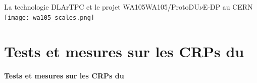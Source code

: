     \begin{frame}{La technologie DLArTPC et le projet WA105}{WA105/\texorpdfstring{ProtoDU$\nu$E}{ProtoDUNE}-DP au CERN}
        \centering
    	\vspace{-0.5cm}\hspace{-0.4cm}\texttt{[image: wa105\_scales.png]}
    \end{frame}

    \section[Tests des CRPs]{Tests et mesures sur les CRPs du \SSS{}}

    {
        \begin{specialframe}
            \vspace{2cm}\hspace*{-1.8cm}\parbox[t]{\textwidth}{
                \begin{center}
                    \begin{Huge}
                            \textcolor{pheniics_purple}{\textbf{Tests et mesures sur les CRPs du \SSS{}}}
                    \end{Huge}
                \end{center}
            }
        \end{specialframe}
    }

